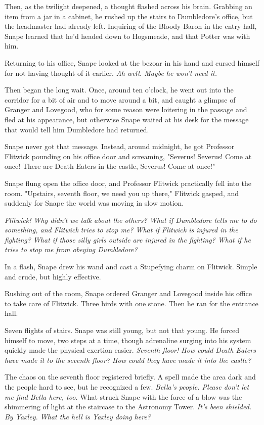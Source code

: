 Then, as the twilight deepened, a thought flashed across his brain. Grabbing an item from a jar in a cabinet, he rushed up the stairs to Dumbledore's office, but the headmaster had already left. Inquiring of the Bloody Baron in the entry hall, Snape learned that he'd headed down to Hogsmeade, and that Potter was with him.

Returning to his office, Snape looked at the bezoar in his hand and cursed himself for not having thought of it earlier. \emph{Ah well. Maybe he won't need it.}

Then began the long wait. Once, around ten o'clock, he went out into the corridor for a bit of air and to move around a bit, and caught a glimpse of Granger and Lovegood, who for some reason were loitering in the passage and fled at his appearance, but otherwise Snape waited at his desk for the message that would tell him Dumbledore had returned.

Snape never got that message. Instead, around midnight, he got Professor Flitwick pounding on his office door and screaming, "Severus! Severus! Come at once! There are Death Eaters in the castle, Severus! Come at once!"

Snape flung open the office door, and Professor Flitwick practically fell into the room. "Upstairs, seventh floor, we need you up there," Flitwick gasped, and suddenly for Snape the world was moving in slow motion.

\emph{Flitwick! Why didn't we talk about the others? What if Dumbledore tells me to do something, and Flitwick tries to stop me? What if Flitwick is injured in the fighting? What if those silly girls outside are injured in the fighting? What if he tries to stop me from obeying Dumbledore?}

In a flash, Snape drew his wand and cast a Stupefying charm on Flitwick. Simple and crude, but highly effective.

Rushing out of the room, Snape ordered Granger and Lovegood inside his office to take care of Flitwick. Three birds with one stone. Then he ran for the entrance hall.

Seven flights of stairs. Snape was still young, but not that young. He forced himself to move, two steps at a time, though adrenaline surging into his system quickly made the physical exertion easier. \emph{Seventh floor! How could Death Eaters have made it to the seventh floor? How could they have made it into the castle?}

The chaos on the seventh floor registered briefly. A spell made the area dark and the people hard to see, but he recognized a few. \emph{Bella's people. Please don't let me find Bella here, too.} What struck Snape with the force of a blow was the shimmering of light at the staircase to the Astronomy Tower. \emph{It's been shielded. By Yaxley. What the hell is Yaxley doing here?}

